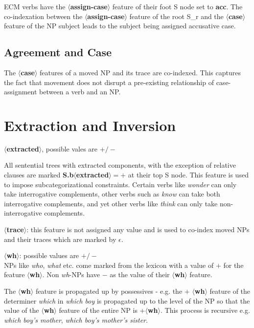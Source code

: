ECM verbs have the {\bf $\langle$assign-case$\rangle$}  feature of their
foot S node set to {\bf acc}. The co-indexation between the 
{\bf $\langle$assign-case$\rangle$} feature of
the root S_{r} and the {\bf $\langle$case$\rangle$} feature of the NP subject
leads to the subject being assigned accusative case.

\subsection{Agreement and Case}
The {\bf $\langle$case$\rangle$} features of a moved NP and its trace 
are co-indexed. This captures the fact that movement does not disrupt 
a pre-existing relationship of case-assignment between a verb and an NP.



\section{Extraction and Inversion}
{\bf $\langle$extracted$\rangle$}, possible vales are {\bf $+/-$}

All sentential trees with extracted components, with the
exception of relative clauses
are marked {\bf S.b$\langle$extracted$\rangle = +$} at their top S node. 
This feature is used to impose subcategorizational constraints. 
Certain verbs like {\em wonder} can only take interrogative complements,
other verbs such as {\em know} can take both interrogative complements,
and yet other verbs like {\em think} can only take non-interrogative complements.

{\bf $\langle$trace$\rangle$}: this feature is not assigned any value and
is used to co-index moved NPs and their traces which are marked by
$\epsilon$.

{\bf $\langle$wh$\rangle$}: possible values are {\bf $+/-$}\\
NPs like {\em who}, {\em what} etc. come marked
from the lexicon  with a value of {\bf $+$} for the feature {\bf $\langle$wh$\rangle$}.
Non {\em wh}-NPs have {\bf $-$} as the value of their 
{\bf $\langle$wh$\rangle$} feature. 

The {\bf $\langle$wh$\rangle$} feature
is propagated up by possessives -  e.g. the $+$ {\bf $\langle$wh$\rangle$}
feature of the determiner {\em which} in {\em which boy} is propagated up
to the level of the NP so that the value of the {\bf $\langle$wh$\rangle$} feature
of the entire NP is $+${\bf $\langle$wh$\rangle$}. This process is recursive
e.g. {\em which boy's mother}, {\em which boy's mother's sister}. 

